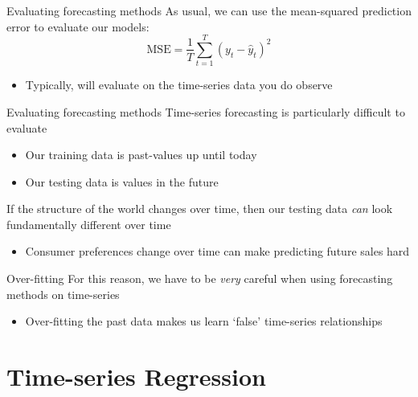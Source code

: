 \documentclass[aspectratio=169,t,11pt,table]{beamer}
\begin{document}
\begin{frame}{Evaluating forecasting methods}
  As usual, we can use the mean-squared prediction error to evaluate our models:
  $$
    \text{MSE} = \frac{1}{T} \sum_{t=1}^T (y_t - \hat{y}_t)^2
  $$

  \begin{itemize}
    \item Typically, will evaluate on the time-series data you do observe
  \end{itemize}
\end{frame}

\begin{frame}{Evaluating forecasting methods}
  Time-series forecasting is particularly difficult to evaluate
  \begin{itemize}
    \item Our training data is past-values up until today
    \item Our testing data is values in the future
  \end{itemize}

  \bigskip
  If the structure of the world changes over time, then our testing data \emph{can} look fundamentally different over time
  \begin{itemize}
    \item Consumer preferences change over time can make predicting future sales hard
  \end{itemize}
\end{frame}

\begin{frame}{Over-fitting}
  For this reason, we have to be \emph{very} careful when using forecasting methods on time-series
  \begin{itemize}
    \item Over-fitting the past data makes us learn `false' time-series relationships
  \end{itemize}
\end{frame}


\section{Time-series Regression}
\end{document}
